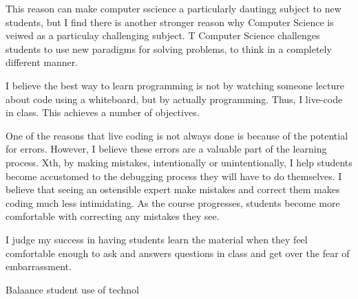 \documentclass[10pt, a4paper]{article}
\begin{document}
This reason can make computer sscience a particularly dautingg subject to new students, but I find there is another stronger reason why Computer Science is veiwed as  a particulay  challenging subject.  
T
Computer Science challenges students to use new paradigms for solving problems, to think in a completely different manner.



I believe the best way to learn programming is not by watching someone lecture about code using a whiteboard, but by actually programming.
Thus, I live-code in class.
This achieves a number of objectives.

One of the reasons that live coding is not always done is because of the potential for errors.
However, I believe these errors are a valuable part of the learning process.
Xth, by making mistakes, intentionally or unintentionally, I help students become accustomed to the debugging process they will have to do themselves.
I believe that seeing an ostensible expert make mistakes and correct them makes coding much less intimidating.
As the course progresses, students become more comfortable with correcting any mistakes they see.




I judge my success in having students learn the material when they feel comfortable enough to ask and  answers questions in class and get over the fear of embarrassment.


Balaance student use of technol
\end{document}
